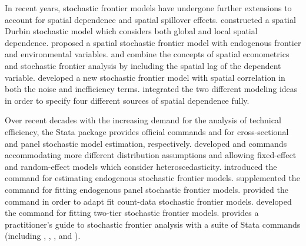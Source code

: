 In recent years, stochastic frontier models have undergone further extensions to account for spatial dependence and spatial spillover effects. \cite*{glass2016spatial} constructed a spatial Durbin stochastic model which considers both global and local spatial dependence. \cite*{kutluSpatialStochasticFrontier2020} proposed a spatial stochastic frontier model with endogenous frontier and environmental variables. \cite*{glass2016spatial} and \cite*{kutluSpatialStochasticFrontier2020} combine the concepts of spatial econometrics and stochastic frontier analysis by including the spatial lag of the dependent variable. \cite*{orea2019new} developed a new stochastic frontier model with spatial correlation in both the noise and inefficiency terms. \cite*{galli2022spatial} integrated the two different modeling ideas in order to specify four different sources of spatial dependence fully.  


Over recent decades with the increasing demand for the analysis of technical efficiency, the Stata package provides official commands  and  for cross-sectional and panel stochastic model estimation, respectively. \cite*{belotti2013stochastic} developed  and  commands accommodating more different distribution assumptions and allowing fixed-effect and random-effect models which  consider heteroscedasticity. \cite{karakaplan2017fitting} introduced the  command for estimating endogenous stochastic frontier models. \cite{mustafaugurkarakaplan2018xtsfkk} supplemented the  command for fitting endogenous panel stochastic frontier models. \cite{eduardo2020} provided the  command in order to adapt fit count-data stochastic frontier models. \cite*{lian2023} developed the  command for fitting two-tier stochastic frontier models. \cite*{kumbhakarpractitioner} provides a practitioner’s guide to stochastic frontier analysis with a suite of Stata commands (including , , , and ).

